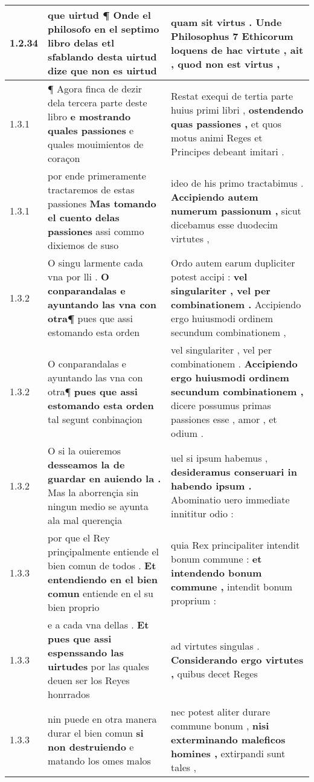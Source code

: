 \begin{tabular}{|p{1cm}|p{6.5cm}|p{6.5cm}|}
1.2.34 & que uirtud \textbf{ ¶ Onde el philosofo en el septimo libro delas etl sfablando desta uirtud dize } que non es uirtud & quam sit virtus . \textbf{ Unde Philosophus 7 Ethicorum loquens de hac virtute , } ait , quod non est virtus , \\\hline
1.3.1 & ¶ Agora finca de dezir dela tercera parte deste libro \textbf{ e mostrando quales passiones } e quales mouimientos de coraçon & Restat exequi de tertia parte huius primi libri , \textbf{ ostendendo quas passiones , } et quos motus animi Reges et Principes debeant imitari . \\\hline
1.3.1 & por ende primeramente tractaremos de estas passiones \textbf{ Mas tomando el cuento delas passiones } assi commo dixiemos de suso & ideo de his primo tractabimus . \textbf{ Accipiendo autem numerum passionum , } sicut dicebamus esse duodecim virtutes , \\\hline
1.3.2 & O singu larmente cada vna por lli . \textbf{ O conparandalas e ayuntando las vna con otra¶ } pues que assi estomando esta orden & Ordo autem earum dupliciter potest accipi : \textbf{ vel singulariter , vel per combinationem . } Accipiendo ergo huiusmodi ordinem secundum combinationem , \\\hline
1.3.2 & O conparandalas e ayuntando las vna con otra¶ \textbf{ pues que assi estomando esta orden } tal segunt conbinaçion & vel singulariter , vel per combinationem . \textbf{ Accipiendo ergo huiusmodi ordinem secundum combinationem , } dicere possumus primas passiones esse , amor , et odium . \\\hline
1.3.2 & O si la ouieremos \textbf{ desseamos la de guardar en auiendo la . } Mas la aborrençia sin ningun medio se ayunta ala mal querençia & uel si ipsum habemus , \textbf{ desideramus conseruari in habendo ipsum . } Abominatio uero immediate innititur odio : \\\hline
1.3.3 & por que el Rey prinçipalmente entiende el bien comun de todos . \textbf{ Et entendiendo en el bien comun } entiende en el su bien proprio & quia Rex principaliter intendit bonum commune : \textbf{ et intendendo bonum commune , } intendit bonum proprium : \\\hline
1.3.3 & e a cada vna dellas . \textbf{ Et pues que assi espenssando las uirtudes } por las quales deuen ser los Reyes honrrados & ad virtutes singulas . \textbf{ Considerando ergo virtutes , } quibus decet Reges \\\hline
1.3.3 & nin puede en otra manera durar el bien comun \textbf{ si non destruiendo } e matando los omes malos & nec potest aliter durare commune bonum , \textbf{ nisi exterminando maleficos homines , } extirpandi sunt tales , \\\hline

\end{tabular}
